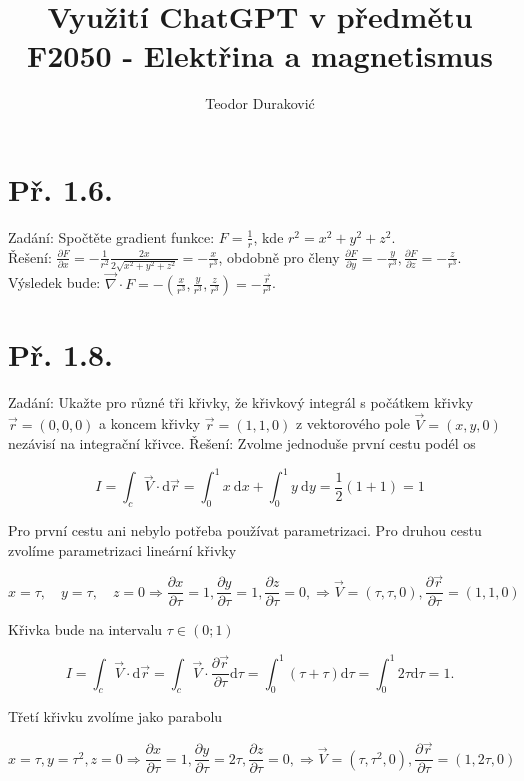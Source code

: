 \documentclass[czech,11pt,a4paper]{article}
\title{Využití ChatGPT v předmětu F2050 - Elektřina a magnetismus}
\author{Teodor Duraković}
\begin{document}
	
	\section{Př. 1.6.}
	
	Zadání: Spočtěte gradient funkce: $F=\frac{1}{r}$, kde $r^{2}=x^{2}+y^{2}+z^{2}$.\\
	
	Řešení: $\frac{\partial F}{\partial x}=-\frac{1}{r^{2}} \frac{2 x}{2 \sqrt{x^{2}+y^{2}+z^{2}}}=-\frac{x}{r^{3}}$, obdobně pro členy $\frac{\partial F}{\partial y}=-\frac{y}{r^{3}}, \frac{\partial F}{\partial z}=-\frac{z}{r^{3}}$. Výsledek bude: $\vec{\nabla} \cdot F=-\left(\frac{x}{r^{3}}, \frac{y}{r^{3}}, \frac{z}{r^{3}}\right)=-\frac{\vec{r}}{r^{3}}$.
	\\
	
	\section{Př. 1.8.}
	
	Zadání: Ukažte pro různé tři křivky, že křivkový integrál s počátkem křivky $\vec{r}=(0,0,0)$ a koncem křivky $\vec{r}=(1,1,0)$ z vektorového pole $\vec{V}=(x, y, 0)$ nezávisí na integrační křivce.
	Řešení: Zvolme jednoduše první cestu podél os
	
	$$
	I=\int_{c} \vec{V} \cdot \mathrm{d} \vec{r}=\int_{0}^{1} x \mathrm{~d} x+\int_{0}^{1} y \mathrm{~d} y=\frac{1}{2}(1+1)=1
	$$
	
	Pro první cestu ani nebylo potřeba používat parametrizaci. Pro druhou cestu zvolíme parametrizaci lineární křivky
	
	$$
	x=\tau, \quad y=\tau, \quad z=0 \Rightarrow \frac{\partial x}{\partial \tau}=1, \frac{\partial y}{\partial \tau}=1, \frac{\partial z}{\partial \tau}=0, \Rightarrow \vec{V}=(\tau, \tau, 0), \frac{\partial \vec{r}}{\partial \tau}=(1,1,0)
	$$
	
	Křivka bude na intervalu $\tau \in(0 ; 1)$
	
	$$
	I=\int_{c} \vec{V} \cdot \mathrm{d} \vec{r}=\int_{c} \vec{V} \cdot \frac{\partial \vec{r}}{\partial \tau} \mathrm{d} \tau=\int_{0}^{1}(\tau+\tau) \mathrm{d} \tau=\int_{0}^{1} 2 \tau \mathrm{d} \tau=1 .
	$$
	
	Třetí křivku zvolíme jako parabolu
	
	$$
	x=\tau, y=\tau^{2}, z=0 \Rightarrow \frac{\partial x}{\partial \tau}=1, \frac{\partial y}{\partial \tau}=2 \tau, \frac{\partial z}{\partial \tau}=0, \Rightarrow \vec{V}=\left(\tau, \tau^{2}, 0\right), \frac{\partial \vec{r}}{\partial \tau}=(1,2 \tau, 0)
	$$
	
\end{document}

